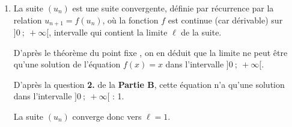 \begin{enumerate}
La suite étant croissante et majorée, on en déduit qu'elle est convergente, vers une limite $\ell$ vérifiant $\dfrac{1}{2} \leqslant \ell \leqslant 1$
		\item  La suite $\left(u_n\right)$ est une suite convergente, définie par récurrence par la relation $u_{n+1} = f\left(u_n\right)$, où la fonction $f$ est continue (car dérivable) sur $]0~;~+\infty[$, intervalle qui contient la limite $\ell$ de la suite.

D'après le théorème \og du point fixe \fg{}, on en déduit que la limite ne peut être qu'une solution de l'équation $f(x) = x$ dans l'intervalle  $]0~;~+\infty[$.

D'après la question \textbf{2.} de la \textbf{Partie B}, cette équation n'a qu'une solution dans  l'intervalle $]0~;~+\infty[$ :  1.

La suite $\left(u_n\right)$ converge donc vers $\ell = 1$.
\end{enumerate}

\bigskip
